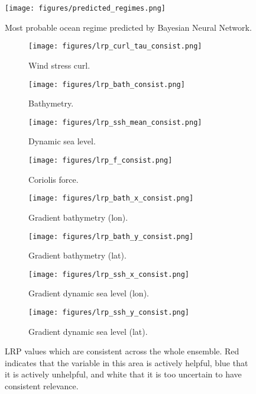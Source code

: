 \documentclass[a4paper]{article}
\begin{document}
\begin{figure}
\begin{minipage}{\textwidth}
\centering
    \texttt{[image: figures/predicted\_regimes.png]}   
    \caption{Most probable ocean regime predicted by Bayesian Neural Network.}\label{fig:predicted_regimes}
    \end{minipage}
\begin{minipage}{\textwidth}
\begin{subfigure}{0.24\textwidth}
    \centering
    \texttt{[image: figures/lrp\_curl\_tau\_consist.png]}
    \caption{Wind stress curl.}
    \label{fig:wind_stress_LRP}
    \end{subfigure}
            \hfill
        \begin{subfigure}{0.24\textwidth}
    \centering
    \texttt{[image: figures/lrp\_bath\_consist.png]}
    \caption{Bathymetry.}
    \label{fig:bath_LRP}
    \end{subfigure}
    \hfill
\begin{subfigure}{0.24\textwidth}
    \centering
    \texttt{[image: figures/lrp\_ssh\_mean\_consist.png]}
    \caption{Dynamic sea level.}
    \label{fig:ssh_LRP}
    \end{subfigure}
    \hfill
  \begin{subfigure}{0.24\textwidth}
    \centering
    \texttt{[image: figures/lrp\_f\_consist.png]}
    \caption{Coriolis force.}
    \label{fig:ssh_F}
    \end{subfigure}  
    
    \begin{subfigure}{0.24\textwidth}
    \centering
    \texttt{[image: figures/lrp\_bath\_x\_consist.png]}
    \caption{Gradient bathymetry (lon).}
    \label{fig:bathx_LRP}
    \end{subfigure}
        \hfill
\begin{subfigure}{0.24\textwidth}
    \centering
    \texttt{[image: figures/lrp\_bath\_y\_consist.png]}
        \caption{Gradient bathymetry (lat).}
    \label{fig:bathy_LRP}
\end{subfigure}
\hfill
\begin{subfigure}{0.24\textwidth}
    \centering
    \texttt{[image: figures/lrp\_ssh\_x\_consist.png]}
    \caption{Gradient dynamic sea level (lon).}
    \label{fig:sshx_LRP}
    \end{subfigure}
        \hfill
\begin{subfigure}{0.24\textwidth}
    \centering
    \texttt{[image: figures/lrp\_ssh\_y\_consist.png]}
        \caption{Gradient dynamic sea level (lat).}
    \label{fig:sshy_LRP}
    \end{subfigure}
    \caption{LRP values which are consistent across the whole ensemble. Red indicates that the variable in this area is actively helpful, blue that it is actively unhelpful, and white that it is too uncertain to have consistent relevance.}\label{LRP_consistent}
    \end{minipage}
\end{figure}
\end{document}
